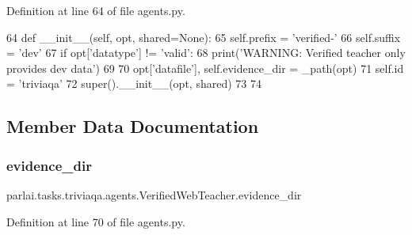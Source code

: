 Definition at line 64 of file agents.\+py.


\begin{DoxyCode}
64     \textcolor{keyword}{def }\_\_init\_\_(self, opt, shared=None):
65         self.prefix = \textcolor{stringliteral}{'verified-'}
66         self.suffix = \textcolor{stringliteral}{'dev'}
67         \textcolor{keywordflow}{if} opt[\textcolor{stringliteral}{'datatype'}] != \textcolor{stringliteral}{'valid'}:
68             print(\textcolor{stringliteral}{'WARNING: Verified teacher only provides dev data'})
69 
70         opt[\textcolor{stringliteral}{'datafile'}], self.evidence\_dir = \_path(opt)
71         self.id = \textcolor{stringliteral}{'triviaqa'}
72         super().\_\_init\_\_(opt, shared)
73 
74 
\end{DoxyCode}


\subsection{Member Data Documentation}
\mbox{\label{classparlai_1_1tasks_1_1triviaqa_1_1agents_1_1VerifiedWebTeacher_a6c7349009918dcbbfc17f930458e8698}} 
\subsubsection{\texorpdfstring{evidence\+\_\+dir}{evidence\_dir}}
{\footnotesize\ttfamily parlai.\+tasks.\+triviaqa.\+agents.\+Verified\+Web\+Teacher.\+evidence\+\_\+dir}



Definition at line 70 of file agents.\+py.

\mbox{\label{classparlai_1_1tasks_1_1triviaqa_1_1agents_1_1VerifiedWebTeacher_a482a09c00640e0bc928c2f8f9b1e20a1}} 
